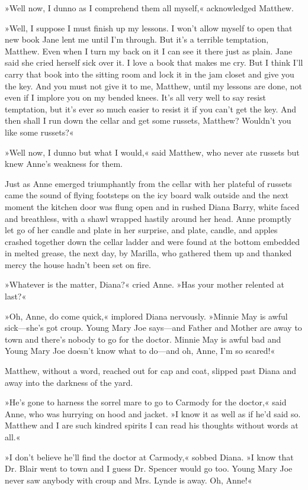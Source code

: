 »Well now, I dunno as I comprehend them all myself,« acknowledged Matthew.

»Well, I suppose I must finish up my lessons. I won't allow myself to open that new book Jane lent me until I'm through. But it's a terrible temptation, Matthew. Even when I turn my back on it I can see it there just as plain. Jane said she cried herself sick over it. I love a book that makes me cry. But I think I'll carry that book into the sitting room and lock it in the jam closet and give you the key. And you must not give it to me, Matthew, until my lessons are done, not even if I implore you on my bended knees. It's all very well to say resist temptation, but it's ever so much easier to resist it if you can't get the key. And then shall I run down the cellar and get some russets, Matthew? Wouldn't you like some russets?«

»Well now, I dunno but what I would,« said Matthew, who never ate russets but knew Anne's weakness for them.

Just as Anne emerged triumphantly from the cellar with her plateful of russets came the sound of flying footsteps on the icy board walk outside and the next moment the kitchen door was flung open and in rushed Diana Barry, white faced and breathless, with a shawl wrapped hastily around her head. Anne promptly let go of her candle and plate in her surprise, and plate, candle, and apples crashed together down the cellar ladder and were found at the bottom embedded in melted grease, the next day, by Marilla, who gathered them up and thanked mercy the house hadn't been set on fire.

»Whatever is the matter, Diana?« cried Anne. »Has your mother relented at last?«

»Oh, Anne, do come quick,« implored Diana nervously. »Minnie May is awful sick—she's got croup. Young Mary Joe says—and Father and Mother are away to town and there's nobody to go for the doctor. Minnie May is awful bad and Young Mary Joe doesn't know what to do—and oh, Anne, I'm so scared!«

Matthew, without a word, reached out for cap and coat, slipped past Diana and away into the darkness of the yard.

»He's gone to harness the sorrel mare to go to Carmody for the doctor,« said Anne, who was hurrying on hood and jacket. »I know it as well as if he'd said so. Matthew and I are such kindred spirits I can read his thoughts without words at all.«

»I don't believe he'll find the doctor at Carmody,« sobbed Diana. »I know that Dr. Blair went to town and I guess Dr. Spencer would go too. Young Mary Joe never saw anybody with croup and Mrs. Lynde is away. Oh, Anne!«


